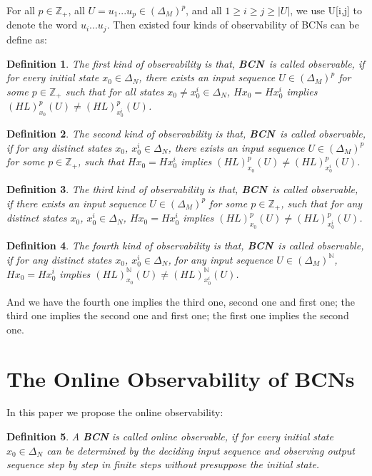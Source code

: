 \documentclass[letterpaper, 10 pt, conference]{ieeeconf}  %
\newtheorem{definition}{Definition}
\def \BCN {{\bf BCN}}
\begin{document}
For all  $p\in \mathbb{Z}_+$, all $U=u_1 ... u_p \in(\Delta_M)^p$, and all $1\ge i \ge j \ge |U|$, we use U[i,j] to denote the word $u_i ... u_j$. Then existed four kinds of observability of BCNs can be define as: 
\begin{definition}
The first kind of observability is that, \BCN\ is called observable, if for every initial state $x_0 \in \Delta_N$, there exists an input sequence $U\in(\Delta_M)^p$ for some $p\in \mathbb{Z}_+$ such that for all states $x_0\neq x^i_0\in \Delta_N$, $Hx_0=Hx^i_0$ implies $(HL)^p_{x_0}(U)\neq (HL)^p_{x^i_0}(U)$.
\end{definition}
\begin{definition}
	The second kind of observability is that, \BCN\ is called observable, if for any distinct states $x_0$, $x^i_0 \in \Delta_N$, there exists an input sequence $U\in(\Delta_M)^p$ for some $p\in \mathbb{Z}_+$, such that $Hx_0=Hx^i_0$ implies $(HL)^p_{x_0}(U)\neq (HL)^p_{x^i_0}(U)$.
\end{definition}
\begin{definition}
	The third kind of observability is that, \BCN\ is called observable, if there exists an input sequence $U\in(\Delta_M)^p$ for some $p\in \mathbb{Z}_+$, such that for any distinct states $x_0$, $x^i_0 \in \Delta_N$, $Hx_0=Hx^i_0$ implies $(HL)^p_{x_0}(U)\neq (HL)^p_{x^i_0}(U)$.
\end{definition}
\begin{definition}
	The fourth kind of observability is that, \BCN\ is called observable, if for any distinct states $x_0$, $x^i_0 \in \Delta_N$, for any input sequence $U\in(\Delta_M)^{\mathbb{N}}$, $Hx_0=Hx^i_0$ implies $(HL)^{\mathbb{N}}_{x_0}(U)\neq (HL)^{\mathbb{N}}_{x^i_0}(U)$.
\end{definition}

And we have the fourth one implies the third one, second one and first one; the third one implies the second one and first one; the first one implies the second one. 
\section{The Online Observability of BCNs}
In this paper we propose the online observability: 

\begin{definition}
	A {\bf BCN} is called online observable, if for every initial state $x_0 \in \Delta_N$ can be determined by the deciding input sequence and observing output sequence step by step in finite steps without presuppose the  initial state.
\end{definition}
\end{document}
